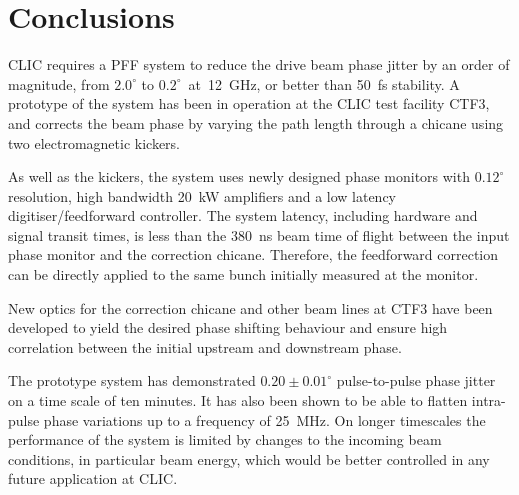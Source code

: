 \documentclass[%
 reprint,
superscriptaddress,
 amsmath,amssymb,
 prl,
]{revtex4-1}
\begin{document}
%
%
%

\section{\label{s:conc}Conclusions}

CLIC requires a PFF system to reduce the drive beam phase jitter by an order of 
magnitude, from \(2.0^\circ\) to \(0.2^\circ\)~at~12~GHz, or better than 50~fs 
stability. A prototype of the system has been 
in operation at the CLIC test facility CTF3, and corrects the beam phase by 
varying the path length through a chicane using two electromagnetic kickers. 

As 
well as the kickers, the system uses newly designed phase monitors with 
\(0.12^\circ\) resolution, high bandwidth 20~kW amplifiers and a low latency 
digitiser/feedforward controller. The system latency, including hardware and 
signal transit times, is less than the 380~ns beam time of flight between the 
input phase monitor and the correction chicane. Therefore, the feedforward 
correction can 
be directly applied to the same bunch initially measured at the monitor.

New optics for the correction chicane and other beam lines at CTF3 have been 
developed to yield the desired phase shifting behaviour and ensure high 
correlation between the initial upstream and downstream phase.

The prototype system has demonstrated \(0.20\pm0.01^\circ\) pulse-to-pulse 
phase jitter on a time scale of ten minutes. It has also been shown to be able 
to flatten intra-pulse phase variations up to a frequency of 25~MHz. On longer 
timescales the performance of the system is limited by changes to the incoming 
beam conditions, in particular beam energy, which would be better controlled in 
any future application at CLIC.
\end{document}
